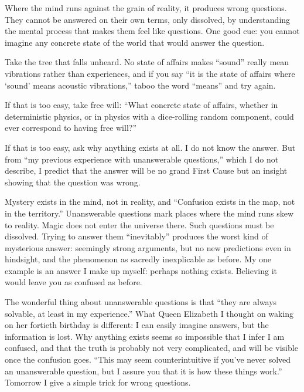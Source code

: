 
Where the mind runs against the grain of reality, it produces wrong questions. They cannot be answered on their own terms, only dissolved, by understanding the mental process that makes them feel like questions. One good cue: you cannot imagine any concrete state of the world that would answer the question. 

Take the tree that falls unheard. No state of affairs makes ``sound'' really mean vibrations rather than experiences, and if you say ``it is the state of affairs where `sound' means acoustic vibrations,'' taboo the word ``means'' and try again.

If that is too easy, take free will: ``What concrete state of affairs, whether in deterministic physics, or in physics with a dice-rolling random component, could ever correspond to having free will?'' 

If that is too easy, ask why anything exists at all. I do not know the answer. But from ``my previous experience with unanswerable questions,'' which I do not describe, I predict that the answer will be no grand First Cause but an insight showing that the question was wrong.

Mystery exists in the mind, not in reality, and ``Confusion exists in the map, not in the territory.'' Unanswerable questions mark places where the mind runs skew to reality. Magic does not enter the universe there. Such questions must be dissolved. Trying to answer them ``inevitably'' produces the worst kind of mysterious answer: seemingly strong arguments, but no new predictions even in hindsight, and the phenomenon as sacredly inexplicable as before. My one example is an answer I make up myself: perhaps nothing exists. Believing it would leave you as confused as before.

The wonderful thing about unanswerable questions is that ``they are always solvable, at least in my experience.''  What Queen Elizabeth I thought on waking on her fortieth birthday is different: I can easily imagine answers, but the information is lost. Why anything exists seems so impossible that I infer I am confused, and that the truth is probably not very complicated, and will be visible once the confusion goes. ``This may seem counterintuitive if you've never solved an unanswerable question, but I assure you that it is how these things work.'' Tomorrow I give a simple trick for wrong questions.

